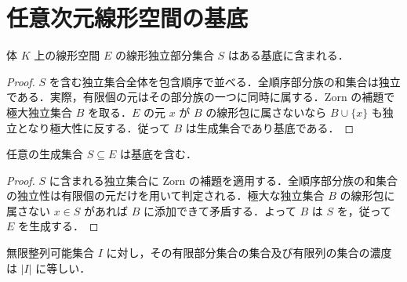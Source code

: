 \section{任意次元線形空間の基底}
\begin{prop}[線形独立集合の基底への拡張]
体 $K$ 上の線形空間 $E$ の線形独立部分集合 $S$ はある基底に含まれる．
\end{prop}
\begin{proof}
$S$ を含む独立集合全体を包含順序で並べる．全順序部分族の和集合は独立である．実際，有限個の元はその部分族の一つに同時に属する．Zorn の補題で極大独立集合 $B$ を取る．$E$ の元 $x$ が $B$ の線形包に属さないなら $B\cup\{x\}$ も独立となり極大性に反する．従って $B$ は生成集合であり基底である．
\end{proof}
\begin{prop}[生成集合からの基底の抽出]
任意の生成集合 $S\subseteq E$ は基底を含む．
\end{prop}
\begin{proof}
$S$ に含まれる独立集合に Zorn の補題を適用する．全順序部分族の和集合の独立性は有限個の元だけを用いて判定される．極大な独立集合 $B$ の線形包に属さない $x\in S$ があれば $B$ に添加できて矛盾する．よって $B$ は $S$ を，従って $E$ を生成する．
\end{proof}
\begin{prop}[無限整列集合の有限部分集合の濃度]
無限整列可能集合 $I$ に対し，その有限部分集合の集合及び有限列の集合の濃度は $|I|$ に等しい．
\end{prop}
